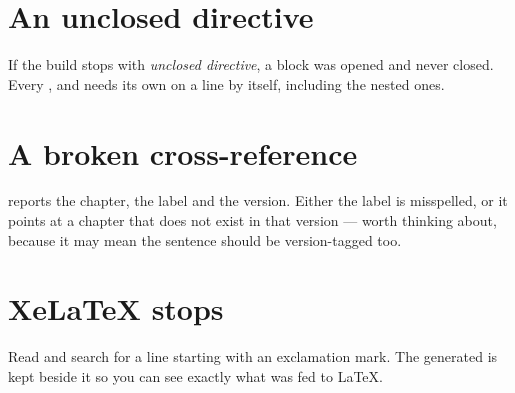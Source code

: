 \documentclass{symbulator}
\begin{document}

\section{An unclosed directive}

If the build stops with \emph{unclosed \symcode{:::} directive}, a block was
opened and never closed. Every ,  and
 needs its own \symcode{:::} on a line by itself, including
the nested ones.

\section{A broken cross-reference}

 reports the chapter, the label and the version. Either the
label is misspelled, or it points at a chapter that does not exist in that
version --- worth thinking about, because it may mean the sentence should be
version-tagged too.

\section{XeLaTeX stops}

Read  and search for a line starting with
an exclamation mark. The generated  is kept beside it so you can
see exactly what was fed to LaTeX.
\end{document}
